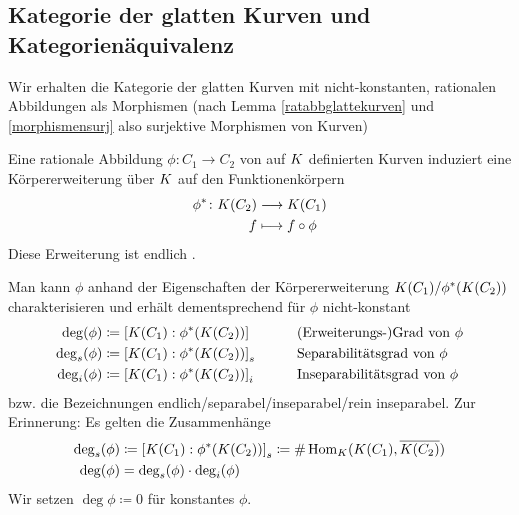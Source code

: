 
\subsection{Kategorie der glatten Kurven und Kategorienäquivalenz}
\begin{Bemerkung}
  Wir erhalten die Kategorie der glatten Kurven
  mit nicht-konstanten, rationalen Abbildungen als Morphismen 
  (nach Lemma \ref{ratabbglattekurven} und \ref{morphismensurj} also
  surjektive Morphismen von Kurven)
\end{Bemerkung}

\begin{LemmaDefinition}\label{funktionenkoerper}
  Eine rationale Abbildung $\phi\colon C_1\to C_2$ von auf $K$
  definierten Kurven induziert eine Körpererweiterung über $K$ auf
  den Funktionenkörpern
  \begin{align*}
    \phi^* \colon K(C_2) &\longrightarrow K(C_1)\\
    f &\longmapsto f\circ \phi
  \end{align*}
  Diese Erweiterung ist endlich
  \cite[siehe][Theorem II.2.4 (a)]{silverman}.

  Man kann $\phi$ anhand der Eigenschaften der Körpererweiterung
  $K(C_1)/\phi^*(K(C_2))$ charakterisieren und erhält
  dementsprechend für $\phi$ nicht-konstant
  \begin{alignat*}{2}
    \deg(\phi) &\coloneqq \left[ K(C_1) : \phi^*(K(C_2)) \right]
    \qquad&&\text{(Erweiterungs-)Grad von }\phi\\
    \operatorname{\deg}_s(\phi) &\coloneqq \left[ K(C_1) : \phi^*(K(C_2)) \right]_s
    \qquad&&\text{Separabilitätsgrad von }\phi\\
    \operatorname{\deg}_i(\phi) &\coloneqq \left[ K(C_1) : \phi^*(K(C_2)) \right]_i
    \qquad&&\text{Inseparabilitätsgrad von }\phi
  \end{alignat*}
  bzw. die Bezeichnungen endlich/separabel/inseparabel/rein
  inseparabel. Zur Erinnerung: Es gelten die Zusammenhänge
  \begin{align*}
    \operatorname{\deg}_s(\phi) 
    &\coloneqq \left[ K(C_1) : \phi^*(K(C_2)) \right]_s
    \coloneqq \#\operatorname{Hom}_K(K(C_1), \overline{K(C_2)})\\
    \deg(\phi) &= \operatorname{\deg}_s(\phi)\cdot\operatorname{\deg}_i(\phi)
  \end{align*}
  Wir setzen $\deg\phi\coloneqq 0$ für konstantes $\phi$.
\end{LemmaDefinition}

